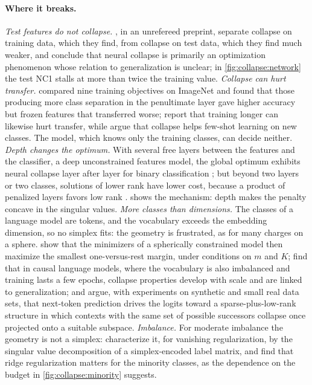 \begin{refsection}
\paragraph{Where it breaks.} \emph{Test features do not collapse.} \Textcite{HuiBelkinNakkiran2022}, in an unrefereed preprint, separate collapse on training data, which they find, from collapse on test data, which they find much weaker, and conclude that neural collapse is primarily an optimization phenomenon whose relation to generalization is unclear; in \cref{fig:collapse:network} the test NC1 stalls at more than twice the training value. \emph{Collapse can hurt transfer.} \Textcite{KornblithEtAl2021} compared nine training objectives on ImageNet and found that those producing more class separation in the penultimate layer gave higher accuracy but frozen features that transferred worse; \textcite{HuiBelkinNakkiran2022} report that training longer can likewise hurt transfer, while \textcite{GalantiGyorgyHutter2022} argue that collapse helps few-shot learning on new classes. The model, which knows only the training classes, can decide neither. \emph{Depth changes the optimum.} With several free layers between the features and the classifier, a deep unconstrained features model, the global optimum exhibits neural collapse layer after layer for binary classification \parencite{SukenikMondelliLampert2023}; but beyond two layers or two classes, solutions of lower rank have lower cost, because a product of penalized layers favors low rank \parencite{SukenikLampertMondelli2024}.  shows the mechanism: depth makes the penalty concave in the singular values. \emph{More classes than dimensions.} The classes of a language model are tokens, and the vocabulary exceeds the embedding dimension, so no simplex fits: the geometry is frustrated, as for many charges on a sphere. \Textcite{JiangEtAl2024} show that the minimizers of a spherically constrained model then maximize the smallest one-versus-rest margin, under conditions on $m$ and $K$; \textcite{WuPapyan2024} find that in causal language models, where the vocabulary is also imbalanced and training lasts a few epochs, collapse properties develop with scale and are linked to generalization; and \textcite{ZhaoEtAl2024} argue, with experiments on synthetic and small real data sets, that next-token prediction drives the logits toward a sparse-plus-low-rank structure in which contexts with the same set of possible successors collapse once projected onto a suitable subspace. \emph{Imbalance.} For moderate imbalance the geometry is not a simplex: \textcite{ThrampoulidisEtAl2022} characterize it, for vanishing regularization, by the singular value decomposition of a simplex-encoded label matrix, and find that ridge regularization matters for the minority classes, as the dependence on the budget in \cref{fig:collapse:minority} suggests.


\end{refsection}
